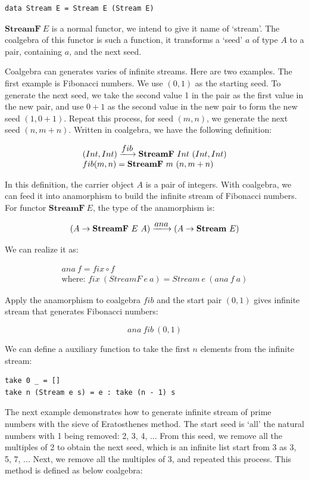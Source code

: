 \documentclass{article}
\begin{document}
\begin{lstlisting}
data Stream E = Stream E (Stream E)
\end{lstlisting}

$\mathbf{StreamF}\ E$ is a normal functor, we intend to give it name of `stream'. The coalgebra of this functor is such a function, it transforms a `seed' $a$ of type $A$ to a pair, containing $a$, and the next seed.

Coalgebra can generates varies of infinite streams. Here are two examples. The first example is Fibonacci numbers. We use $(0, 1)$ as the starting seed. To generate the next seed, we take the second value 1 in the pair as the first value in the new pair, and use $0 + 1$ as the second value in the new pair to form the new seed $(1, 0 + 1)$. Repeat this process, for seed $(m, n)$, we generate the next seed $(n, m + n)$. Written in coalgebra, we have the following definition:

\[
\begin{array}{l}
(Int, Int) \arrowto{fib} \mathbf{StreamF}\ Int\ (Int, Int) \\
fib (m, n) = \mathbf{StreamF}\ m\ (n, m + n)
\end{array}
\]

In this definition, the carrier object $A$ is a pair of integers. With coalgebra, we can feed it into anamorphism to build the infinite stream of Fibonacci numbers. For functor $\mathbf{StreamF}\ E$, the type of the anamorphism is:

\[
(A \to \mathbf{StreamF}\ E\ A) \arrowto{ana} (A \to \mathbf{Stream}\ E)
\]

We can realize it as:

\[
\begin{array}{l}
ana\ f = fix \circ f \\
\text{where: } fix\ (StreamF\ e\ a) = Stream\ e\ (ana\ f\ a)
\end{array}
\]

Apply the anamorphism to coalgebra $fib$ and the start pair $(0, 1)$ gives infinite stream that generates Fibonacci numbers:

\[
ana\ fib\ (0, 1)
\]

We can define a auxiliary function to take the first $n$ elements from the infinite stream:

\begin{lstlisting}
take 0 _ = []
take n (Stream e s) = e : take (n - 1) s
\end{lstlisting}

The next example demonstrates how to generate infinite stream of prime numbers with the sieve of Eratosthenes method. The start seed is `all' the natural numbers with 1 being removed: 2, 3, 4, ... From this seed, we remove all the multiples of 2 to obtain the next seed, which is an infinite list start from 3 as 3, 5, 7, ... Next, we remove all the multiples of 3, and repeated this process. This method is defined as below coalgebra:
\end{document}
